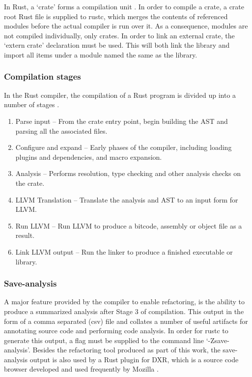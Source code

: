 In Rust, a `crate' forms a compilation unit \cite{examplecrates15}. In order to compile a crate, a crate root Rust file is supplied to rustc, which merges the contents of referenced modules before the actual compiler is run over it. As a consequence, modules are not compiled individually, only crates. In order to link an external crate, the `extern crate' declaration must be used. This will both link the library and import all items under a module named the same as the library. 

\subsubsection{Compilation stages}
In the Rust compiler, the compilation of a Rust program is divided up into a number of stages \cite{driver15}. 

\begin{enumerate}
\item Parse input -- From the crate entry point, begin building the AST and parsing all the associated files.
\item Configure and expand -- Early phases of the compiler, including loading plugins and dependencies, and macro expansion.
\item Analysis -- Performs resolution, type checking and other analysis checks on the crate.
\item LLVM Translation -- Translate the analysis and AST to an input form for LLVM.
\item Run LLVM -- Run LLVM to produce a bitcode, assembly or object file as a result.
\item Link LLVM output -- Run the linker to produce a finished executable or library.
\end{enumerate}

\subsubsection{Save-analysis}
A major feature provided by the compiler to enable refactoring, is the ability to produce a summarized analysis after Stage 3 of compilation. This output in the form of a comma separated (csv) file and collates a number of useful artifacts for annotating source code and performing code analysis. In order for rustc to generate this output, a flag must be supplied to the command line `-Zsave-analysis'. Besides the refactoring tool produced as part of this work, the save-analysis output is also used by a Rust plugin for DXR, which is a source code browser developed and used frequently by Mozilla \cite{dxr15}.  

